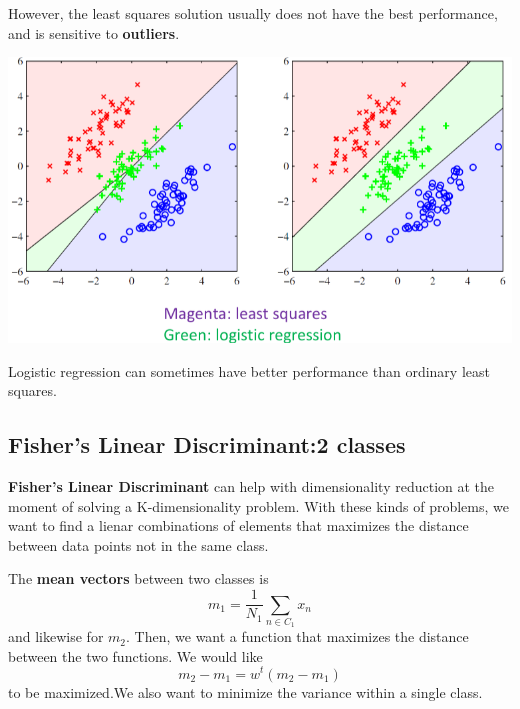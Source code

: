 \documentclass{tufte-handout}
\begin{document}
	However, the least squares solution usually does not have the best performance, and is 
	sensitive to \textbf{outliers}.
	\begin{marginfigure}
			\includegraphics[width=\linewidth]{ls_not_good}
			\caption{Logistic regression can sometimes have better performance than
				ordinary least squares.}
	\end{marginfigure}
\subsection{Fisher's Linear Discriminant:2 classes}
	\textbf{Fisher's Linear Discriminant} can help with dimensionality reduction at the moment
	of solving a K-dimensionality problem. With these kinds of problems, we want to find a lienar
	combinations of elements that maximizes the distance between data points not in the same class.

	The \textbf{mean vectors} between two classes is 
	\[ m_{1} = \frac{1}{N_{1}} \sum_{n\in C_{1}}^{}x_{n}\]
	and likewise for $m_{2}$. Then, we want a function that maximizes the distance between the two
	functions. We would like  
	\[ m_{2} - m_{1} = w^{t}(m_{2} - m_{1})\]
	to be maximized.We also want to minimize the variance within a single class.
\end{document}
